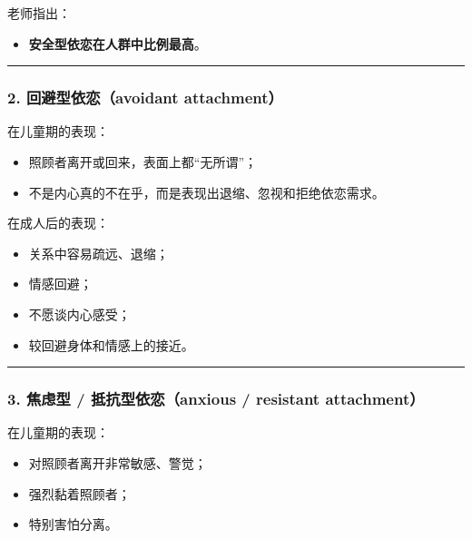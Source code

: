 \documentclass[
  chinese,
  9pt,
  a4paper,
]{ctexart}
\providecommand{\tightlist}{%
  \setlength{\itemsep}{0pt}\setlength{\parskip}{0pt}}
\begin{document}
老师指出：

\begin{itemize}
\tightlist
\item
  \textbf{安全型依恋在人群中比例最高}。
\end{itemize}

\begin{center}\rule{0.5\linewidth}{0.5pt}\end{center}

\subsubsection{2. 回避型依恋（avoidant
attachment）}\label{ux56deux907fux578bux4f9dux604bavoidant-attachment}

在儿童期的表现：

\begin{itemize}
\tightlist
\item
  照顾者离开或回来，表面上都``无所谓''；
\item
  不是内心真的不在乎，而是表现出退缩、忽视和拒绝依恋需求。
\end{itemize}

在成人后的表现：

\begin{itemize}
\tightlist
\item
  关系中容易疏远、退缩；
\item
  情感回避；
\item
  不愿谈内心感受；
\item
  较回避身体和情感上的接近。
\end{itemize}

\begin{center}\rule{0.5\linewidth}{0.5pt}\end{center}

\subsubsection{3. 焦虑型 / 抵抗型依恋（anxious / resistant
attachment）}\label{ux7126ux8651ux578b-ux62b5ux6297ux578bux4f9dux604banxious-resistant-attachment}

在儿童期的表现：

\begin{itemize}
\tightlist
\item
  对照顾者离开非常敏感、警觉；
\item
  强烈黏着照顾者；
\item
  特别害怕分离。
\end{itemize}
\end{document}
